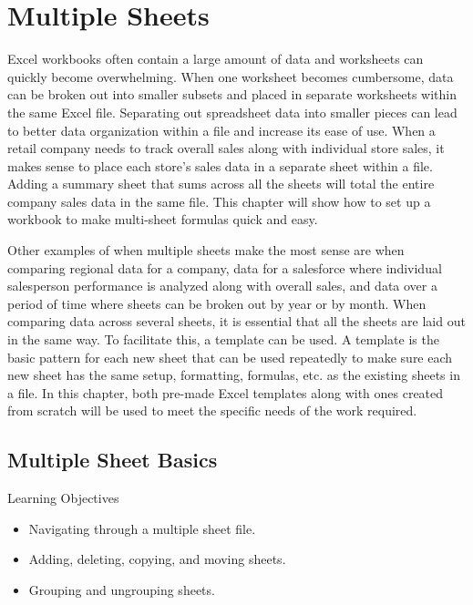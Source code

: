 \chapter{Multiple Sheets}\label{ch06:multiple_sheets}

Excel workbooks often contain a large amount of data and worksheets can quickly become overwhelming. When one worksheet becomes cumbersome, data can be broken out into smaller subsets and placed in separate worksheets within the same Excel file. Separating out spreadsheet data into smaller pieces can lead to better data organization within a file and increase its ease of use. When a retail company needs to track overall sales along with individual store sales, it makes sense to place each store's sales data in a separate sheet within a file. Adding a summary sheet that sums across all the sheets will total the entire company sales data in the same file. This chapter will show how to set up a workbook to make multi-sheet formulas quick and easy.

Other examples of when multiple sheets make the most sense are when comparing regional data for a company, data for a salesforce where individual salesperson performance is analyzed along with overall sales, and data over a period of time where sheets can be broken out by year or by month. When comparing data across several sheets, it is essential that all the sheets are laid out in the same way. To facilitate this, a template can be used. A template is the basic pattern for each new sheet that can be used repeatedly to make sure each new sheet has the same setup, formatting, formulas, etc. as the existing sheets in a file. In this chapter, both pre-made Excel templates along with ones created from scratch will be used to meet the specific needs of the work required.

\section{Multiple Sheet Basics}

\begin{center}
	\begin{objbox}{Learning Objectives}
		\begin{itemize}
			\setlength{\itemsep}{0pt}
			\setlength{\parskip}{0pt}
			\setlength{\parsep}{0pt}
			
			\item Navigating through a multiple sheet file.
			\item Adding, deleting, copying, and moving sheets.
			\item Grouping and ungrouping sheets.

		\end{itemize}
	\end{objbox}
\end{center}

